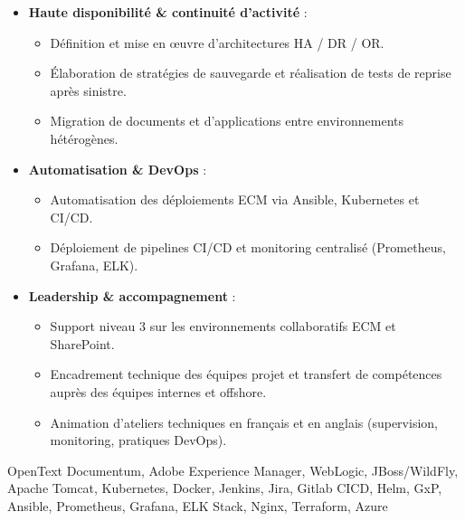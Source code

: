 \begin{experiences}
{\begin{itemize}[left=0pt,label={},itemsep=0.5em]
          \item \textbf{Haute disponibilité \& continuité d’activité} :
            \begin{itemize}[itemsep=0.2em,topsep=0.2em,parsep=0pt]
              \small
              \item Définition et mise en œuvre d’architectures HA / DR / OR.
              \item Élaboration de stratégies de sauvegarde et réalisation de tests de reprise après sinistre.
              \item Migration de documents et d’applications entre environnements hétérogènes.
            \end{itemize}

          \item \textbf{Automatisation \& DevOps} :
            \begin{itemize}[itemsep=0.2em,topsep=0.2em,parsep=0pt]
              \small
              \item Automatisation des déploiements ECM via Ansible, Kubernetes et CI/CD.
              \item Déploiement de pipelines CI/CD et monitoring centralisé (Prometheus, Grafana, ELK).
            \end{itemize}


          \item \textbf{Leadership \& accompagnement} :
            \begin{itemize}[itemsep=0.2em,topsep=0.2em,parsep=0pt]
              \small
              \item Support niveau 3 sur les environnements collaboratifs ECM et SharePoint.
              \item Encadrement technique des équipes projet et transfert de compétences auprès des équipes internes et offshore.
              \item Animation d’ateliers techniques en français et en anglais (supervision, monitoring, pratiques DevOps).
            \end{itemize}
        \end{itemize}
        \vspace{0.5em}  %
    }
    {OpenText Documentum, Adobe Experience Manager, WebLogic, JBoss/WildFly, Apache Tomcat, Kubernetes, Docker, Jenkins, Jira, Gitlab CICD, Helm, GxP, Ansible, Prometheus, Grafana, ELK Stack, Nginx, Terraform, Azure}
    


\end{experiences}
